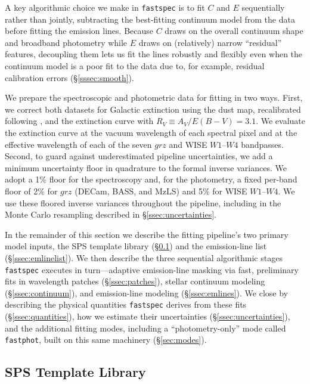 \documentclass[modern,linenumbers]{aastex702}
\newcommand{\fastspec}{\texttt{fastspec}}
\newcommand{\fastphot}{\texttt{fastphot}}
\begin{document}
A key algorithmic choice we make in \fastspec{} is to fit $C$ and $E$
sequentially rather than jointly, subtracting the best-fitting
continuum model from the data before fitting the emission
lines. Because $C$
draws on the overall continuum shape and broadband photometry while
$E$ draws on (relatively) narrow ``residual'' features, decoupling
them lets us fit the lines robustly and flexibly even when the
continuum model is a poor fit to the data due to, for example,
residual calibration errors (\S\ref{sssec:smooth}).

We prepare the spectroscopic and photometric data for fitting in two
ways. First, we correct both datasets for Galactic extinction using the
\citet{schlegel98a} dust map, recalibrated following
\citet{schlafly11a}, and the \citet{fitzpatrick99a} extinction curve
with $R_V\equiv A_V/E(B-V)=3.1$. We evaluate the extinction curve at
the vacuum wavelength of each spectral pixel and at the effective
wavelength of each of the seven $grz$ and WISE $W1$--$W4$ bandpasses.
Second, to guard against underestimated pipeline uncertainties, we add
a minimum uncertainty floor in quadrature to the formal inverse
variances. We adopt a 1\% floor for the spectroscopy and, for the
photometry, a fixed per-band floor of 2\% for $grz$ (DECam, BASS, and
MzLS) and 5\% for WISE $W1$--$W4$. We use these floored inverse
variances throughout the pipeline, including in the Monte Carlo
resampling described in \S\ref{ssec:uncertainties}.

In the remainder of this section we describe the fitting pipeline's
two primary model inputs, the SPS template library
(\S\ref{ssec:templates}) and the emission-line list
(\S\ref{ssec:emlinelist}). We then describe the three sequential
algorithmic stages \fastspec{} executes in turn---adaptive
emission-line masking via fast, preliminary fits in wavelength patches
(\S\ref{ssec:patches}), stellar continuum modeling
(\S\ref{ssec:continuum}), and emission-line modeling
(\S\ref{ssec:emlines}). We close by describing the physical quantities
\fastspec{} derives from these fits (\S\ref{ssec:quantities}), how we
estimate their uncertainties (\S\ref{ssec:uncertainties}), and the
additional fitting modes, including a ``photometry-only'' mode called
\fastphot, built on this same machinery (\S\ref{sec:modes}).

\subsection{SPS Template Library}
\label{ssec:templates}
\end{document}
